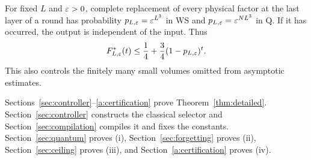 For fixed \(L\) and \(\varepsilon>0\), complete replacement of every physical
factor at the last layer of a round has probability
\(p_{L,\varepsilon}=\varepsilon^{L^3}\) in \(\mathrm{WS}\) and
\(p_{L,\varepsilon}=\varepsilon^{NL^3}\) in \(\mathrm Q\). If it has occurred, the output is
independent of the input. Thus
\begin{equation}\label{eq:finite-reset}
 F^*_{L,\varepsilon}(t)\le\frac14+\frac34(1-p_{L,\varepsilon})^t.
\end{equation}
This also controls the finitely many small volumes omitted from
asymptotic estimates.

Sections~\ref{sec:controller}--\ref{a:certification} prove Theorem~\ref{thm:detailed}. Section~\ref{sec:controller} constructs the classical selector and Section~\ref{sec:compilation} compiles it and fixes the constants. Section~\ref{sec:quantum} proves (i), Section~\ref{sec:forgetting} proves (ii), Section~\ref{sec:ceiling} proves (iii), and Section~\ref{a:certification} proves (iv).
